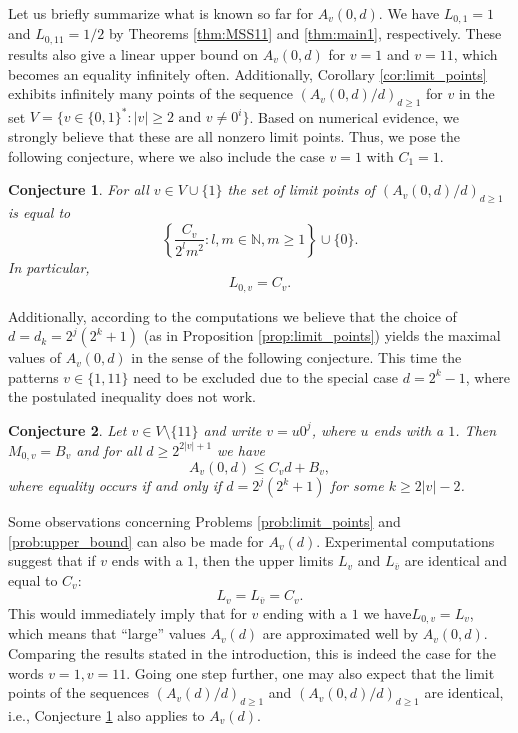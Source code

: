 \documentclass[a4paper,11pt]{amsart}
\newtheorem{con}{Conjecture}
\theoremstyle{definition}
\newcommand{\N}{\mathbb{N}}
\begin{document}
Let us briefly summarize what is known so far for $A_v(0,d)$. We have $L_{0,1} = 1$ and $L_{0,11}=1/2$ by Theorems \ref{thm:MSS11} and \ref{thm:main1}, respectively. These results also give a linear upper bound on $A_v(0,d)$ for $v=1$ and $v=11$, which becomes an equality infinitely often. Additionally, Corollary \ref{cor:limit_points} exhibits infinitely many points of the sequence $(A_v(0,d)/d)_{d \geq 1}$ for $v$ in the set $V = \{v \in \{0,1\}^*: |v| \geq 2 \text{ and } v \neq 0^i\}$. Based on numerical evidence, we strongly believe that these are all nonzero limit points. Thus, we pose the following conjecture, where we also include the case $v=1$ with $C_1 = 1$.

\begin{con} \label{con:limit_points}
For all $v \in V \cup \{1\}$ the set of limit points of $(A_v(0,d)/d)_{d \geq 1}$ is equal to
$$ \left\{ \frac{C_v}{2^l m^2}: l,m \in \N, m \geq 1 \right\} \cup \{0\}.$$
In particular, 
$$ L_{0,v} = C_v. $$
\end{con}


Additionally, according to the computations we believe that the choice of $d =d_k = 2^j(2^k+1)$ (as in Proposition \ref{prop:limit_points}) yields the maximal values of $A_v(0,d)$ in the sense of the following conjecture. This time the patterns $v \in \{1,11\}$ need to be excluded due to the special case $d = 2^k-1$, where the postulated inequality does not work. 

\begin{con} \label{con:upper_bound}
Let $v \in V \setminus \{11\}$ and write $v = u0^j$, where $u$ ends with a $1$. Then $M_{0,v} = B_v$ and for all $d \geq 2^{2|v|+1}$ we have
$$A_v(0,d) \leq C_v d + B_v,$$
where equality occurs if and only if $d = 2^j(2^k+1)$ for some $k \geq 2|v|-2$.
\end{con}

Some observations concerning Problems \ref{prob:limit_points} and \ref{prob:upper_bound} can also be made for $A_v(d)$. Experimental computations suggest that if $v$ ends with a $1$, then the upper limits $L_v$ and $L_{\overline{v}}$ are identical and equal to $C_v$:
\begin{equation} \label{eq:limsup}
L_v = L_{\overline{v}} = C_v.
\end{equation}
This would immediately imply that for $v$ ending with a $1$ we have$L_{0,v} = L_v$, which means that ``large'' values $A_v(d)$ are approximated well by $A_v(0,d)$. Comparing the results stated in the introduction, this is indeed the case for the words $v =1,v=11$. Going one step further, one may also expect that the limit points of the sequences $(A_v(d)/d)_{d \geq 1}$ and $(A_v(0,d)/d)_{d \geq 1}$ are identical, i.e., Conjecture \ref{con:limit_points} also applies to $A_v(d)$.
\end{document}
